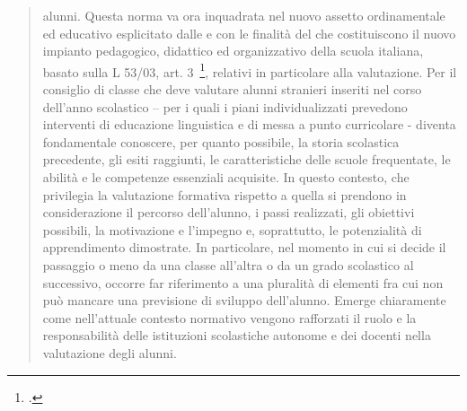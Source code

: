 \begin{quote}
\begin{description}
 			alunni. Questa norma va ora inquadrata nel nuovo assetto ordinamentale ed educativo
 			esplicitato dalle  e con le finalità
 			del  che costituiscono il nuovo impianto pedagogico, didattico ed organizzativo della scuola italiana, basato sulla L 53/03, art. 3~\footcite{Legge_53_2003}, relativi in particolare alla valutazione.
 			Per il consiglio di classe che deve valutare alunni stranieri inseriti nel corso dell'anno
 			scolastico – per i quali i piani individualizzati prevedono interventi di educazione
 			linguistica e di messa a punto curricolare - diventa fondamentale conoscere, per quanto
 			possibile, la storia scolastica precedente, gli esiti raggiunti, le caratteristiche delle scuole
 			frequentate, le abilità e le competenze essenziali acquisite. In questo contesto, che privilegia
 			la valutazione formativa rispetto a quella  si prendono in considerazione il percorso dell'alunno, i passi realizzati, gli obiettivi possibili, la motivazione e l'impegno e,
 			soprattutto, le potenzialità di apprendimento dimostrate. In particolare, nel momento in cui
 			si decide il passaggio o meno da una classe all'altra o da un grado scolastico al successivo,
 			occorre far riferimento a una pluralità di elementi fra cui non può mancare una previsione di
 			sviluppo dell'alunno. Emerge chiaramente come nell'attuale contesto normativo vengono
 			rafforzati il ruolo e la responsabilità delle istituzioni scolastiche autonome e dei docenti
 			nella valutazione degli alunni.
 	\end{description}
 \end{quote}
